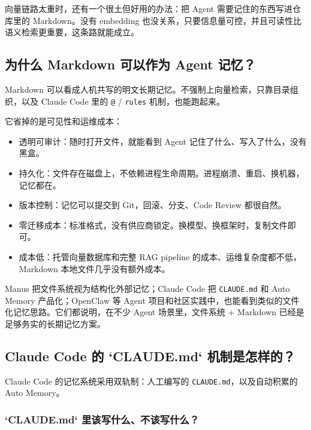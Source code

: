 \documentclass[9pt,a4paper,twocolumn]{ctexart}
\begin{document}
向量链路太重时，还有一个很土但好用的办法：把 Agent 需要记住的东西写进仓库里的 Markdown。没有 embedding 也没关系，只要信息量可控，并且可读性比语义检索更重要，这条路就能成立。



\subsection*{为什么 Markdown 可以作为 Agent 记忆？}


Markdown 可以看成人机共写的明文长期记忆。不强制上向量检索，只靠目录组织，以及 Claude Code 里的 \texttt{@} / \texttt{rules} 机制，也能跑起来。



它省掉的是可见性和运维成本：


\begin{itemize}[itemsep=1pt, topsep=2pt]
  \item 透明可审计：随时打开文件，就能看到 Agent 记住了什么、写入了什么，没有黑盒。
  \item 持久化：文件存在磁盘上，不依赖进程生命周期。进程崩溃、重启、换机器，记忆都在。
  \item 版本控制：记忆可以提交到 Git，回滚、分支、Code Review 都很自然。
  \item 零迁移成本：标准格式，没有供应商锁定。换模型、换框架时，复制文件即可。
  \item 成本低：托管向量数据库和完整 RAG pipeline 的成本、运维复杂度都不低，Markdown 本地文件几乎没有额外成本。
\end{itemize}


Manus 把文件系统视为结构化外部记忆；Claude Code 把 \texttt{CLAUDE.md} 和 Auto Memory 产品化；OpenClaw 等 Agent 项目和社区实践中，也能看到类似的文件化记忆思路。它们都说明，在不少 Agent 场景里，文件系统 + Markdown 已经是足够务实的长期记忆方案。



\subsection*{Claude Code 的 `CLAUDE.md` 机制是怎样的？}


Claude Code 的记忆系统采用双轨制：人工编写的 \texttt{CLAUDE.md}，以及自动积累的 Auto Memory。



\subsubsection{`CLAUDE.md` 里该写什么、不该写什么？}
\end{document}
